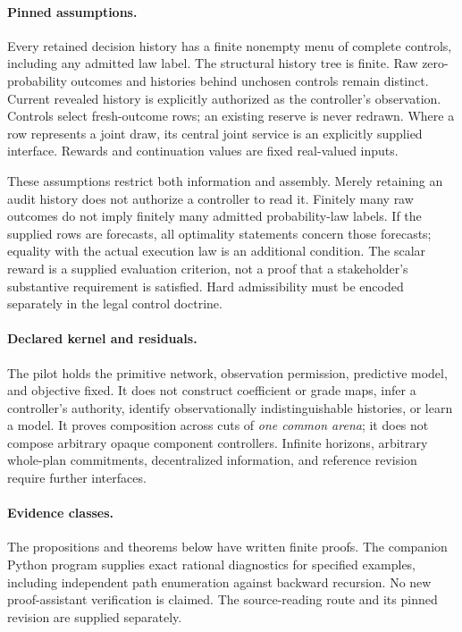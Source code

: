 \documentclass[11pt]{article}
\theoremstyle{definition}
\begin{document}
\paragraph{Pinned assumptions.}
Every retained decision history has a finite nonempty menu of complete
controls, including any admitted law label. The structural history tree is
finite. Raw zero-probability outcomes and histories behind unchosen controls
remain distinct. Current revealed history is explicitly authorized as the
controller's observation. Controls select fresh-outcome rows; an existing
reserve is never redrawn. Where a row represents a joint draw, its central
joint service is an explicitly supplied interface. Rewards and continuation
values are fixed real-valued inputs.

These assumptions restrict both information and assembly. Merely retaining
an audit history does not authorize a controller to read it. Finitely many
raw outcomes do not imply finitely many admitted probability-law labels.
If the supplied rows are forecasts, all optimality statements concern those
forecasts; equality with the actual execution law is an additional condition.
The scalar reward is a supplied evaluation criterion, not a proof that a
stakeholder's substantive requirement is satisfied. Hard admissibility must
be encoded separately in the legal control doctrine.

\paragraph{Declared kernel and residuals.}
The pilot holds the primitive network, observation permission, predictive
model, and objective fixed. It does not construct coefficient or grade maps,
infer a controller's authority, identify observationally indistinguishable
histories, or learn a model. It proves composition across cuts of \emph{one
common arena}; it does not compose arbitrary opaque component controllers.
Infinite horizons, arbitrary whole-plan commitments, decentralized
information, and reference revision require further interfaces.

\paragraph{Evidence classes.}
The propositions and theorems below have written finite proofs. The companion
Python program supplies exact rational diagnostics for specified examples,
including independent path enumeration against backward recursion. No new
proof-assistant verification is claimed. The source-reading route and its
pinned revision are supplied separately.
\end{document}
